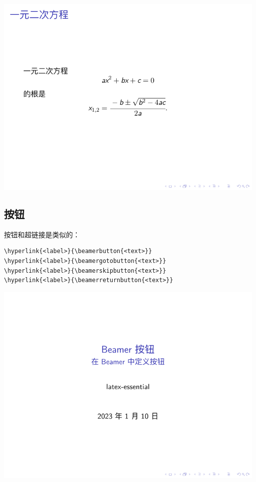 \begin{column}{0.5\textwidth}
\includegraphics[page=2]{examples/beamer/beamerhyperlink01.pdf}

\subsection{按钮}

按钮和超链接是类似的：

\begin{verbatim}
\hyperlink{<label>}{\beamerbutton{<text>}}
\hyperlink{<label>}{\beamergotobutton{<text>}}
\hyperlink{<label>}{\beamerskipbutton{<text>}}
\hyperlink{<label>}{\beamerreturnbutton{<text>}}
\end{verbatim}

\includegraphics[page=2]{examples/beamer/beamerhyperlink02.pdf}


\end{column}
